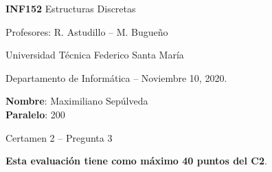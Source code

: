 \documentclass[legalpaper,10pt]{article}
\begin{document}
\thispagestyle{empty}

\begin{minipage}[t]{0.6\textwidth}

{\LARGE \textbf{INF152} Estructuras Discretas}

{\large Profesores: R. Astudillo -- M. Bugueño}

Universidad Técnica Federico Santa María

Departamento de Informática -- Noviembre 10, 2020.

\end{minipage}
\hfill
\begin{minipage}[t]{0.35\textwidth}
\textbf{Nombre}: Maximiliano Sepúlveda\\[0.3cm]
  \textbf{Paralelo}: 200
\end{minipage}

\vspace{0.8cm}

{\Large Certamen 2 -- Pregunta 3}

\vspace{0.4cm}

\textbf{Esta evaluación tiene como máximo 40 puntos del C2}.
\end{document}
